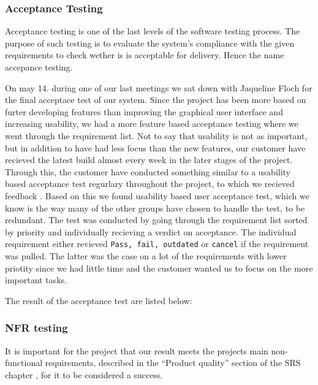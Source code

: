\subsubsection{Acceptance Testing}
Acceptance testing is one of the last levels of the software testing process. The purpose of such testing is to evaluate the system's compliance with the given requirements to check wether is is acceptable for delivery. Hence the name accepance testing.

On may 14. during one of our last meetings we sat down with Jaqueline Floch for the final acceptace test of our system. Since the project has been more based on furter developing features than improving the graphical user interface and increasing usability, we had a more feature based acceptance testing where we went through the requirement list. Not to say that usability is not as important, but in addition to have had less focus than the new features, our customer have recieved the latest build almost every week in the later stages of the project. Through this, the customer have conducted something similar to a usability based acceptance test regurlary throughout the project, to which we recieved feedback . Based on this we found usability based user acceptance test, which we know is the way many of the other groups have chosen to handle the test, to be redundant.
The test was conducted by going through the requirement list sorted by priority and individually recieving a verdict on acceptance. The individual requirement either revieved \texttt{Pass, fail, outdated} or \texttt{cancel} if the requirement was pulled. The latter was the case on a lot of the requirements with lower priotity since we had little time and the customer wanted us to focus on the more important tasks.

The result of the acceptance test are listed below:\\



\subsubsection{NFR testing}
It is important for the project that our result meets the projects main non-functional requirements, described in the ``Product quality'' section of the SRS chapter , for it to be considered a success. 

